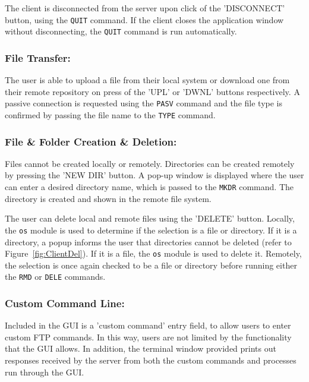 \documentclass[10pt,twocolumn]{witseiepaper}
\begin{document}
The client is disconnected from the server upon click of the 'DISCONNECT' button, using the \texttt{QUIT} command. If the client closes the application window without disconnecting, the \texttt{QUIT} command is run automatically.

\vspace*{-2mm}
\subsubsection*{File Transfer: }
The user is able to upload a file from their local system or download one from their remote repository on press of the 'UPL' or 'DWNL' buttons respectively. A passive connection is requested using the \texttt{PASV} command and the file type is confirmed by passing the file name to the \texttt{TYPE} command.

\vspace*{-2mm}
\subsubsection*{File \& Folder Creation \& Deletion: }
Files cannot be created locally or remotely. Directories can be created remotely by pressing the 'NEW DIR' button. A pop-up window is displayed where the user can enter a desired directory name, which is passed to the \texttt{MKDR} command. The directory is created and shown in the remote file system. 

The user can delete local and remote files using the 'DELETE' button. Locally, the \texttt{os} module is used to determine if the selection is a file or directory. If it is a directory, a popup informs the user that directories cannot be deleted (refer to Figure~\ref{fig:ClientDel}). If it is a file, the \texttt{os} module is used to delete it. Remotely, the selection is once again checked to be a file or directory before running either the \texttt{RMD} or \texttt{DELE} commands.

\vspace*{-2mm}
\subsubsection*{Custom Command Line: }
Included in the GUI is a 'custom command' entry field, to allow users to enter custom FTP commands. In this way, users are not limited by the functionality that the GUI allows. In addition, the terminal window provided prints out responses received by the server from both the custom commands and processes run through the GUI.
\end{document}
